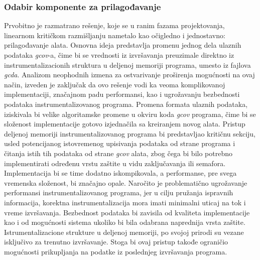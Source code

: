 \documentclass[12pt,oneside]{memoir}
\newcommand{\strano}[1]{\textit{#1}}
\begin{document}
\subsubsection{Odabir komponente za prilagođavanje}


Prvobitno je razmatrano rešenje, koje se u ranim fazama projektovanja, linearnom kritičkom razmišljanju nametalo kao očigledno i jednostavno: prilagođavanje alata. Osnovna ideja predstavlja promenu jednog dela ulaznih podataka \strano{gcov}-a, čime bi se vrednosti iz izvršavanja preuzimale direktno iz instrumentalizacionih struktura u deljenoj memoriji programa, umesto iz fajlova \strano{gcda}. Analizom neophodnih izmena za ostvarivanje proširenja mogućnosti na ovaj način, izveden je zaključak da ovo rešenje vodi ka veoma komplikovanoj implementaciji, značajnom padu performansi, kao i ugrožavanju bezbednosti podataka instrumentalizovanog programa. Promena formata ulaznih podataka, iziskivala bi velike algoritamske promene u okviru koda \strano{gcov} programa, čime bi se složenost implementacije gotovo izjednačila sa kreiranjem novog alata. Pristup deljenoj memoriji instrumentalizovanog programa bi predstavljao kritičnu sekciju, usled potencijanog istovremenog upisivanja podataka od strane programa i čitanja istih tih podataka od strane \strano{gcov} alata, zbog čega bi bilo potrebno implementirati određenu vrstu zaštite u vidu zaključavanja ili semafora. Implementacija bi se time dodatno iskompikovala, a performanse, pre svega vremenska složenost, bi značajno opale. Naročito je problematično ugrožavanje performansi instrumentalizovanog programa, jer u cilju pružanja ispravnih informacija, korektna instrumentalizacija mora imati minimalni uticaj na tok i vreme izvršavanja. Bezbednost podataka bi zavisila od kvaliteta implementacije kao i od mogućnosti sistema ukoliko bi bila odabrana naprednija vrsta zaštite. Istrumentalizacione strukture u deljenoj memoriji, po svojoj prirodi su vezane isključivo za trenutno izvršavanje. Stoga bi ovaj pristup takođe ograničio mogućnosti prikupljanja na podatke iz poslednjeg izvršavanja programa. 
\end{document}
